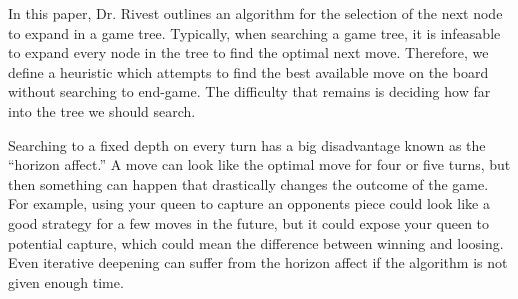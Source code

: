 \documentclass[12pt]{article}
\begin{document}
In this paper, Dr. Rivest outlines an algorithm for the selection of the next node to expand in a game tree. Typically, when searching a game tree, it is infeasable to expand every node in the tree to find the optimal next move. Therefore, we define a heuristic which attempts to find the best available move on the board without searching to end-game. The difficulty that remains is deciding how far into the tree we should search.

Searching to a fixed depth on every turn has a big disadvantage known as the ``horizon affect.'' A move can look like the optimal move for four or five turns, but then something can happen that drastically changes the outcome of the game. For example, using your queen to capture an opponents piece could look like a good strategy for a few moves in the future, but it could expose your queen to potential capture, which could mean the difference between winning and loosing. Even iterative deepening can suffer from the horizon affect if the algorithm is not given enough time.
\end{document}
